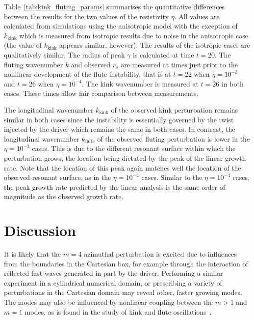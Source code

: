 \documentclass[fleqn,usenatbib]{mnras}
\newcommand{\rs}[2]{{#2}}
\begin{document}
Table~\ref{tab:kink_fluting_params} summarises the quantitative
differences between the results for the two values of \rs{}{the
  resistivity} $\eta$. All values are calculated from simulations using the \rs{switching}{anisotropic} model with the exception of $k_{\rs{kink}{\text{kink}}}$ which is measured from isotropic results due to noise in the \rs{switching}{anisotropic} case (the value of $k_{\rs{kink}{\text{kink}}}$ appears similar, however). The results of the isotropic cases are qualitatively similar. The radius of peak $\gamma$ is calculated at time $t=20$. The fluting wavenumber $k$ and observed $r_s$ are measured at times just prior to the nonlinear development of the \rs{fluting}{flute} instability, that is at $t=22$ when $\eta=10^{-3}$ and $t=26$ when $\eta = 10^{-4}$. The kink wavenumber is measured at $t=26$ in both cases. These times allow fair comparison between measurements.

The longitudinal wavenumber $k_{\rs{kink}{\text{kink}}}$ of the observed kink perturbation remains similar in both cases since the instability is essentially governed by the twist injected by the driver which remains the same in both cases. In contrast, the longitudinal wavenumber $k_{\rs{flute}{\text{flute}}}$ of the observed fluting perturbation is lower in the $\eta=10^{-3}$ cases. This is due to the different resonant surface within which the perturbation grows, the location being dictated by the peak of the linear growth rate. Note that the location of this peak again matches well the location of the observed resonant surface, as in the $\eta=10^{-4}$ cases. Similar to the $\eta=10^{-4}$ cases, the peak growth rate predicted by the linear analysis is the same order of magnitude as the observed growth rate.

\section{Discussion}
\label{sec-discussion}

\rs{Due to the perturbations arising from numerical noise, it}{It} is
likely that the $m=4$ \rs{}{azimuthal} perturbation is excited due to
influences from the boundaries in the Cartesian box, for example
through the interaction of reflected fast waves generated in part by
the driver. Performing a similar experiment in a cylindrical numerical
domain, or prescribing a variety of perturbations in the Cartesian
domain may reveal other, faster growing modes. The modes may also be
influenced by nonlinear coupling between the $m>1$ and $m=1$ modes, as
is found in the study of kink and \rs{fluting}{flute}
oscillations~\citep{terradasEffectMagneticTwist2018,rudermanNonlinearGenerationFluting2017}. 
\end{document}
